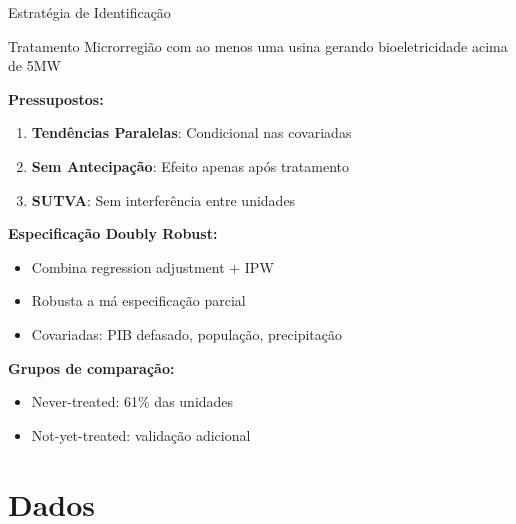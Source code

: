 \documentclass[10pt,aspectratio=169]{beamer}
\begin{document}
\begin{frame}{Estratégia de Identificação}
\begin{block}{Tratamento}
Microrregião com ao menos uma usina gerando bioeletricidade acima de 5MW
\end{block}

\textbf{Pressupostos:}
\begin{enumerate}
    \item \textbf{Tendências Paralelas}: Condicional nas covariadas
    \item \textbf{Sem Antecipação}: Efeito apenas após tratamento
    \item \textbf{SUTVA}: Sem interferência entre unidades
\end{enumerate}

\textbf{Especificação Doubly Robust:}
\begin{itemize}
    \item Combina regression adjustment + IPW
    \item Robusta a má especificação parcial
    \item Covariadas: PIB defasado, população, precipitação
\end{itemize}

\textbf{Grupos de comparação:}
\begin{itemize}
    \item Never-treated: 61\% das unidades
    \item Not-yet-treated: validação adicional
\end{itemize}
\end{frame}

\section{Dados}
\end{document}
